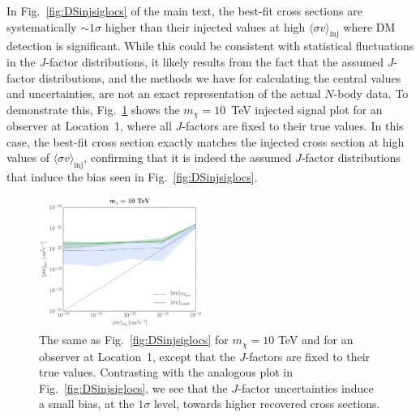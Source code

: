 In Fig.~\ref{fig:DSinjsiglocs} of the main text,  the best-fit cross sections are systematically $\sim1$$\sigma$ higher than their injected values at high $\langle \sigma v \rangle_\text{inj}$ where DM detection is significant.  While this could be consistent with statistical fluctuations in the $J$-factor distributions, it  likely results from the fact that the assumed $J$-factor distributions, and the methods we have for calculating the central values and uncertainties, are not an exact representation of the actual $N$-body data.  To demonstrate this, Fig.~\ref{fig:noJuncertainty} shows the $m_\chi = 10$~TeV injected signal plot for an observer at Location~1, where all $J$-factors are fixed to their true values.  In this case, the best-fit cross section exactly matches the injected cross section at high values of $\langle \sigma v \rangle_\text{inj}$, confirming that it is indeed the assumed $J$-factor distributions that induce the bias seen in Fig.~\ref{fig:DSinjsiglocs}.

\begin{figure}[t]
   \centering
   \includegraphics[width=0.48\textwidth]{ch-darksky/plots//signal_recovery_10TeV_noJuncert.pdf} \hspace{0.01cm}
   \caption{ The same as Fig.~\ref{fig:DSinjsiglocs} for $m_\chi = 10$ TeV and for an observer at Location~1, except that the $J$-factors are fixed to their true values. Contrasting with the analogous plot in Fig.~\ref{fig:DSinjsiglocs}, we see that the $J$-factor uncertainties induce a small bias, at the $1$$\sigma$ level, towards higher recovered cross sections. }
   \label{fig:noJuncertainty}
\end{figure}

